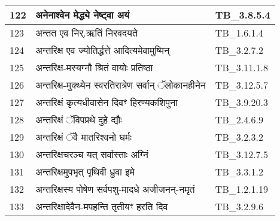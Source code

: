 \documentclass[17pt]{extarticle}
\begin{document}
\begin{longtable}{||p{0.4in}||p{4.9in}||p{0.9in}||}
    \hline
        
    122 & अनेनाश्वेन मेद्ध्ये नेष्ट्वा अयं & TB\_3.8.5.4       \\
    
    \hline
        
    123 & अन्तत एव निर्.ऋतिं निरवदयते & TB\_1.6.1.4       \\
    
    \hline
        
    124 & अन्तरिक्ष एव ज्योतिर्द्धत्ते आदित्यमेवामुष्मिन् & TB\_3.2.7.2       \\
    
    \hline
        
    125 & अन्तरिक्ष{-}मस्यग्नौ श्रितं वायोः प्रतिष्ठा & TB\_3.11.1.8       \\
    
    \hline
        
    126 & अन्तरिक्ष{-}मुक्थ्येन स्वरतिरात्रेण सर्वान् ॅलोकानहीनेन & TB\_3.12.5.7       \\
    
    \hline
        
    127 & अन्तरिक्षं कृत्यधीवासेन दिवꣳ हिरण्यकशिपुना & TB\_3.9.20.3       \\
    
    \hline
        
    128 & अन्तरिक्षं ॅविपप्रथे दुहे द्यौः & TB\_2.4.6.9       \\
    
    \hline
        
    129 & अन्तरिक्षं ॅवै मातरिश्वनो घर्मः & TB\_3.2.3.2       \\
    
    \hline
        
    130 & अन्तरिक्षचरञ्च यत् सर्वास्ताः अग्निं & TB\_3.12.7.5       \\
    
    \hline
        
    131 & अन्तरिक्षमुपभृत् पृथिवी ध्रुवा इमे & TB\_3.3.1.2       \\
    
    \hline
        
    132 & अन्तरिक्षस्य पोषेण सर्वपशु{-}मादधे अजीजनन्{-}नमृतं & TB\_1.2.1.19       \\
    
    \hline
        
    133 & अन्तरिक्षादेवैन{-}मपहन्ति तृतीयꣳ हरति दिव & TB\_3.2.9.6       \\
    

\end{longtable}
\end{document}
